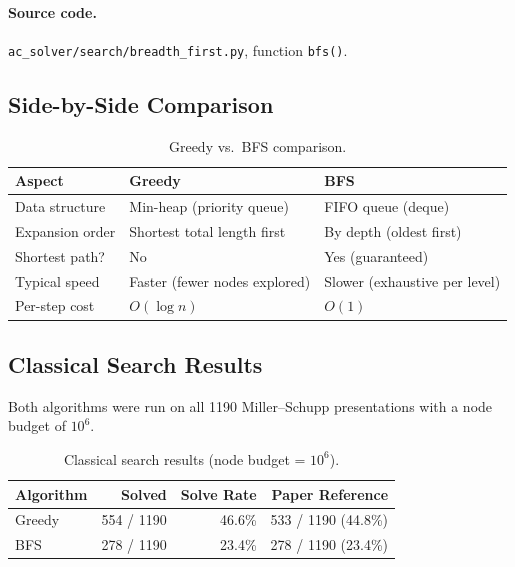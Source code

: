 \documentclass[11pt,a4paper]{article}
\begin{document}
\paragraph{Source code.}
\texttt{ac\_solver/search/breadth\_first.py}, function \texttt{bfs()}.

\subsection{Side-by-Side Comparison}

\begin{table}[h]
\centering
\caption{Greedy vs.\ BFS comparison.}
\label{tab:greedy-vs-bfs}
\begin{tabular}{lll}
  \toprule
  \textbf{Aspect} & \textbf{Greedy} & \textbf{BFS} \\
  \midrule
  Data structure     & Min-heap (priority queue)           & FIFO queue (deque) \\
  Expansion order    & Shortest total length first         & By depth (oldest first) \\
  Shortest path?     & No                                  & Yes (guaranteed) \\
  Typical speed      & Faster (fewer nodes explored)       & Slower (exhaustive per level) \\
  Per-step cost      & $O(\log n)$                         & $O(1)$ \\
  \bottomrule
\end{tabular}
\end{table}

\subsection{Classical Search Results}\label{sec:classical-results}

Both algorithms were run on all 1190 Miller--Schupp presentations with a node
budget of $10^6$.

\begin{table}[h]
\centering
\caption{Classical search results (node budget = $10^6$).}
\label{tab:classical-results}
\begin{tabular}{lrrr}
  \toprule
  \textbf{Algorithm} & \textbf{Solved} & \textbf{Solve Rate} & \textbf{Paper Reference} \\
  \midrule
  Greedy  & 554 / 1190 & 46.6\% & 533 / 1190 (44.8\%) \\
  BFS     & 278 / 1190 & 23.4\% & 278 / 1190 (23.4\%) \\
  \bottomrule
\end{tabular}
\end{table}
\end{document}
